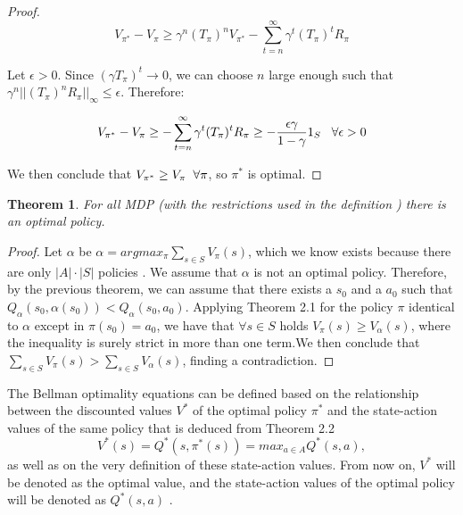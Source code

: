\documentclass[12pt]{article}
\newtheorem{theorem}{Theorem}[section]
\numberwithin{equation}{section}
\begin{document}
\begin{proof}
   $$V_{\pi^*}- V_{\pi} \geq \gamma^n (T_\pi)^n V_{\pi^*}- \sum_{t=n}^{\infty}\gamma^t (T_\pi)^t R_\pi $$ 



   Let $\epsilon >0$. Since $ (\gamma T_\pi)^t \rightarrow 0$, we can choose $n$ large enough such that $\gamma^n ||(T_\pi)^n R_\pi||_\infty \leq \epsilon$. Therefore: 

   $$ V_{\pi^*}- V_{\pi} \geq  - \sum_{t=n}^{\infty}\gamma^t (T_\pi)^t R_\pi \geq  -\frac{\epsilon \gamma}{1-\gamma} 1_S 
 \hspace{3mm}  \forall \epsilon >0$$ 

 We then conclude that $V_{\pi^*} \geq V_{\pi} \hspace{2mm} \forall \pi $, so $\pi^*$ is optimal.


    
\end{proof}



\begin{theorem}
    For all MDP (with the restrictions used in the definition ) there is an optimal policy.
\end{theorem}



\begin{proof}
    Let  $\alpha$ be $\alpha= argmax_{\pi}\sum_{s \in S}V_{\pi}(s)$, which we know exists because there are only $|A|\cdot |S|$ policies . We assume that $\alpha$ is not an optimal policy. Therefore, by the previous theorem, we can assume that there exists a $s_0$ and a $a_0$ such that $Q_{\alpha}(s_0,\alpha(s_0)) <Q_{\alpha}(s_0,a_0) $. Applying Theorem 2.1 for the policy $\pi$ identical to $\alpha$ except in $\pi(s_0)=a_0$, we have that $\forall s \in S$ holds $V_{\pi} (s)\geq V_{\alpha}(s)$, where the inequality is surely strict in more than one term.We then  conclude that $\sum_{s \in S}V_{\pi}(s) >\sum_{s \in S}V_{\alpha}(s)$,  finding  a contradiction.
\end{proof}






The Bellman  optimality equations can be defined based on the relationship between the discounted values $V^*$  of the optimal policy $\pi^*$  and the state-action values of the same policy that is deduced from Theorem 2.2
$$V^*(s)=Q^*(s,\pi^ *(s))=max_{a\in A}Q^*(s,a), $$as well as on the very definition of these state-action values. From now on, $V^*$  will be  denoted as the optimal value, and the state-action values of the optimal policy will be denoted as $Q^*(s,a)$ .
\end{document}
